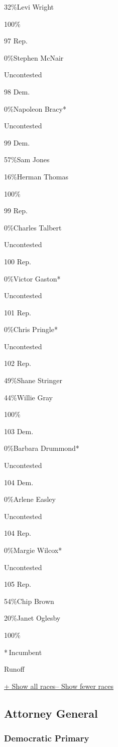  32\%Levi Wright

100\%

97 Rep.

 0\%Stephen McNair

Uncontested

98 Dem.

 0\%Napoleon Bracy*

Uncontested

99 Dem.

 57\%Sam Jones

 16\%Herman Thomas

100\%

99 Rep.

 0\%Charles Talbert

Uncontested

100 Rep.

 0\%Victor Gaston*

Uncontested

101 Rep.

 0\%Chris Pringle*

Uncontested

102 Rep.

 49\%Shane Stringer

 44\%Willie Gray

100\%

103 Dem.

 0\%Barbara Drummond*

Uncontested

104 Dem.

 0\%Arlene Easley

Uncontested

104 Rep.

 0\%Margie Wilcox*

Uncontested

105 Rep.

 54\%Chip Brown

 20\%Janet Oglesby

100\%

* Incumbent~

 Runoff

\protect\hyperlink{}{+ Show all races-- Show fewer races}

\hypertarget{attorney-general}{%
\subsection{Attorney General}\label{attorney-general}}

\hypertarget{democratic-primary-9}{%
\subsubsection{Democratic Primary}\label{democratic-primary-9}}

